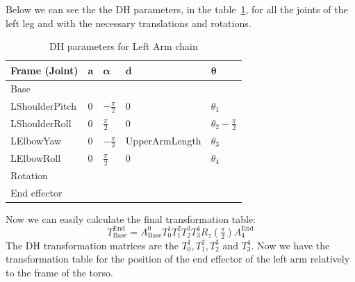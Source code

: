 Below we can see the the DH parameters, in the table~\ref{tab:DHlarm}, for all the joints of the left leg and with the necessary translations and rotations.
\begin{table}[!h]
\centering
\caption{DH parameters for Left Arm chain}
\begin{tabular}{|l|>{\centering\arraybackslash}m{2.55cm}|>{\centering\arraybackslash}m{2.55cm}|>{\centering\arraybackslash}m{2.55cm}|>{\centering\arraybackslash}m{2.55cm}|}
\hline
\textbf{Frame (Joint)} & $\mathbf{a}$ & $\boldsymbol{\alpha}$ & $\mathbf{d}$ & $\boldsymbol{\theta}$\\ \hline
Base & \multicolumn{4}{|c|}{$A(0,\text{\footnotesize{ShoulderOffsetY+ElbowOffsetY}},\text{\footnotesize{ShoulderOffsetZ}})$} \\ \hline
LShoulderPitch & $0$ & $-\frac{\pi}{2}$ & $0$ & $\theta_1$ \\ \hline
LShoulderRoll & $0$ & $\frac{\pi}{2}$ & $0$ & $\theta_2 - \frac{\pi}{2}$ \\ \hline
LElbowYaw & $0$ & $-\frac{\pi}{2}$ & \footnotesize{UpperArmLength} & $\theta_3$ \\ \hline
LElbowRoll & $0$ & $\frac{\pi}{2}$ & $0$ & $\theta_4$ \\ \hline
Rotation & \multicolumn{4}{c|}{$R_z(\frac{\pi}{2})$} \\ \hline
End effector & \multicolumn{4}{c|}{$A(\text{\footnotesize{HandOffsetX+LowerArmLength}},0,0)$} \\ \hline
\end{tabular}
\label{tab:DHlarm}
\end{table}
Now we can easily calculate the final transformation table:
\[
T^\text{End}_\text{Base} = A^0_\text{Base}T^1_0T^2_1T^3_2T^4_3R_z(\tfrac{\pi}{2})A^\text{End}_{4}
\]
The DH transformation matrices are the $T^1_0,T^2_1,T^3_2\text{ and }T^4_3$. Now we have the transformation table for the position of the end effector of the left arm relatively to the frame of the torso.

